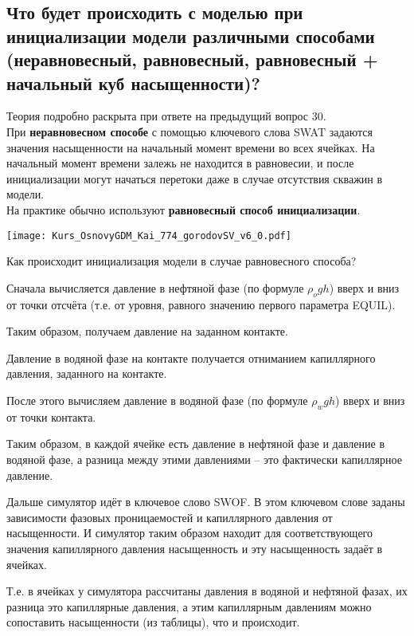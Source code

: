

\subsection{Что будет происходить с моделью при инициализации модели различными способами (неравновесный, равновесный, равновесный + начальный куб насыщенности)?}

Теория подробно раскрыта при ответе на предыдущий вопрос 30.
\\

При \textbf{неравновесном способе} с помощью ключевого слова SWAT задаются значения насыщенности на начальный момент времени во всех ячейках.
На начальный момент времени залежь не находится в равновесии, и после инициализации могут начаться перетоки даже в случае отсутствия скважин в модели.
\\

На практике обычно используют \textbf{равновесный способ инициализации}.

\texttt{[image: Kurs\_OsnovyGDM\_Kai\_774\_gorodovSV\_v6\_0.pdf]}

Как происходит инициализация модели в случае равновесного способа?

Сначала вычисляется давление в нефтяной фазе (по формуле $\rho_o gh$) вверх и вниз от точки отсчёта (т.е. от уровня, равного значению первого параметра EQUIL).

Таким образом, получаем давление на заданном контакте.

Давление в водяной фазе на контакте получается отниманием капиллярного давления, заданного на контакте.

После этого вычисляем давление в водяной фазе (по формуле $\rho_w gh$) вверх и вниз от точки контакта.

Таким образом, в каждой ячейке есть давление в нефтяной фазе и давление в водяной фазе, а разница между этими давлениями -- это фактически капиллярное давление.

Дальше симулятор идёт в ключевое слово SWOF.
В этом ключевом слове заданы зависимости фазовых проницаемостей и капиллярного давления от насыщенности.
И симулятор таким образом находит для соответствующего значения капиллярного давления насыщенность и эту насыщенность задаёт в ячейках.

Т.е. в ячейках у симулятора рассчитаны давления в водяной и нефтяной фазах, их разница это капиллярные давления, а этим капиллярным давлениям можно сопоставить насыщенности (из таблицы), что и происходит.
\\

